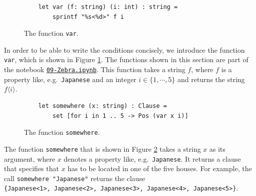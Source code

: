 \begin{figure}[!ht]
\centering
\begin{verbatim}
    let var (f: string) (i: int) : string =
        sprintf "%s<%d>" f i
\end{verbatim}
\vspace*{-0.3cm}
\caption{The function \texttt{var}.}
\label{fig:var_f_i}
\end{figure}

In order to be able to write the conditions concisely, we introduce the function
\texttt{var}, which is shown in Figure \ref{fig:var_f_i}.  The functions shown in this section are part of the
notebook
\href{https://github.com/karlstroetmann/Logic/blob/master/F-Sharp/Chapter-4/09-Zebra.ipynb}{\texttt{09-Zebra.ipynb}}.  This function
takes a string $f$, where $f$ is a property like, e.g.~\texttt{Japanese} and an
integer $i \in \{1,\cdots,5\}$ and returns the string $f\langle i\rangle$.




\begin{figure}[!ht]
\centering
\begin{verbatim}
    let somewhere (x: string) : Clause =
        set [for i in 1 .. 5 -> Pos (var x i)]
\end{verbatim}
\vspace*{-0.3cm}
\caption{The function \texttt{somewhere}.}
\label{fig:somewhere}
\end{figure}
The function \texttt{somewhere} that is shown in Figure \ref{fig:somewhere}
takes a string $x$ as its argument, where $x$ denotes a property like,
e.g.~\texttt{Japanese}.  It returns a clause that specifies that $x$ has to be
located in one of the five houses.  For example,  the call
\texttt{somewhere "Japanese"} returns the clause
\\[0.2cm]
\hspace*{1.3cm}
\texttt{\{Japanese<1>, Japanese<2>, Japanese<3>, Japanese<4>, Japanese<5>\}}.

